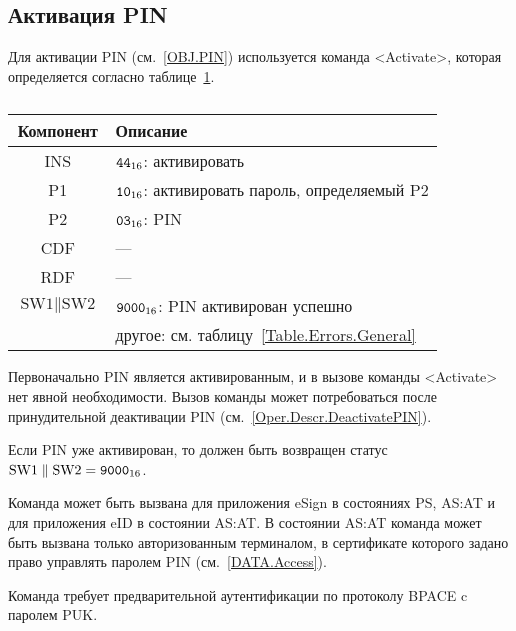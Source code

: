 %


\subsection{Активация PIN}\label{Oper.Descr.ActivatePIN}

Для активации PIN (см.~\ref{OBJ.PIN})  используется
команда <Activate>, которая определяется согласно 
таблице~\ref{Table.Oper.ActivatePINCmd}.

\begin{table}[hbt]
\caption{}\label{Table.Oper.ActivatePINCmd}
\begin{tabular}{|c|p{14cm}|}
\hline
Компонент & Описание\\
\hline
\hline
INS & $\texttt{44}_{16}$: активировать\\
\hline
P1 & $\texttt{10}_{16}$: активировать пароль, определяемый P2\\
\hline
P2 & $\texttt{03}_{16}$: PIN \\
\hline
CDF &  ---  \\
\hline 
RDF &  --- \\
\hline
$\text{SW1} \parallel \text{SW2}$ & 
  $\texttt{9000}_{16}$:  PIN активирован успешно\\
  & другое: см. таблицу~\ref{Table.Errors.General}\\
\hline
\end{tabular}
\end{table}

Первоначально PIN является активированным, и в вызове команды <Activate> 
нет явной необходимости. Вызов команды может потребоваться после 
принудительной деактивации PIN (см.~\ref{Oper.Descr.DeactivatePIN}). 

Если PIN уже активирован, то должен быть возвращен 
статус $\text{SW1} \parallel \text{SW2} = \texttt{9000}_{16}$.

Команда может быть вызвана для приложения eSign 
в состояниях PS, AS:AT и для приложения eID в состоянии AS:AT. 
В состоянии AS:AT команда может быть вызвана 
только авторизованным терминалом, в сертификате которого задано право
управлять паролем PIN (см.~\ref{DATA.Access}).

Команда требует предварительной аутентификации по 
протоколу BPACE c паролем PUK.


